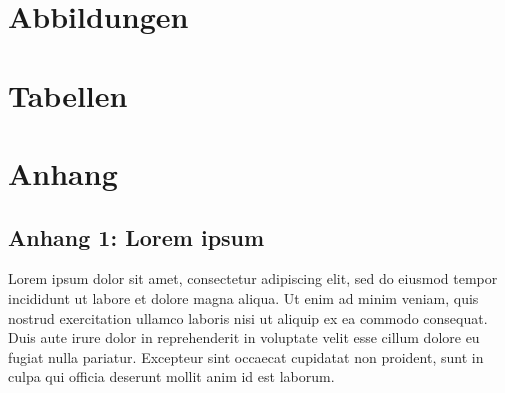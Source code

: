 \documentclass[10pt,a4paper, ngerman]{article}
\begin{document}
\newpage
\section*{Abbildungen}\label{sec:abbildungen}
\renewcommand{\listfigurename}{}
\listoffigures

\newpage
\section*{Tabellen}\label{sec:tabellen}
\renewcommand{\listtablename}{}
\listoftables


\newpage
{}
\pagestyle{fancy}
\fancyhf{}
\fancyhead[L]{\leftmark}
\fancyhead[R]{\thepage}
\renewcommand{\headrulewidth}{0.4pt}

% 







\setcounter{page}{\thesavepage+1}
\pagestyle{fancy}
\fancyhf{}
\fancyhead[L]{\thepage}
\fancyhead[R]{\thepage}
\renewcommand{\headrulewidth}{0.4pt}

\newpage
{}
\makeatletter
\renewcommand\@biblabel[1]{}
\makeatother
{}
\begingroup
\let\itshape\upshape


\endgroup

\newpage
\section*{Anhang}
\subsection*{Anhang 1: Lorem ipsum}
Lorem ipsum dolor sit amet, consectetur adipiscing elit, sed do eiusmod tempor incididunt ut labore et dolore magna aliqua. Ut enim ad minim veniam, quis nostrud exercitation ullamco laboris nisi ut aliquip ex ea commodo consequat. Duis aute irure dolor in reprehenderit in voluptate velit esse cillum dolore eu fugiat nulla pariatur. Excepteur sint occaecat cupidatat non proident, sunt in culpa qui officia deserunt mollit anim id est laborum.
\end{document}
